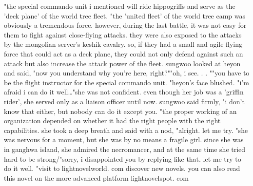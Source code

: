 "the special commando unit i mentioned will ride hippogriffs and serve as the 'deck plane' of the world tree fleet.
"the 'united fleet' of the world tree camp was obviously a tremendous force.
 however, during the last battle, it was not easy for them to fight against close-flying attacks.
 they were also exposed to the attacks by the mongolian server's keshik cavalry.
so, if they had a small and agile flying force that could act as a deck plane, they could not only defend against such an attack but also increase the attack power of the fleet.
sungwoo looked at heyon and said, "now you understand why you're here, right?""oh, i see.
.
.
""you have to be the flight instructor for the special commando unit.
"heyon's face blushed.
 "i'm afraid i can do it well…"she was not confident.
 even though her job was a 'griffin rider', she served only as a liaison officer until now.
 sungwoo said firmly, "i don't know that either, but nobody can do it except you.
"the proper working of an organization depended on whether it had the right people with the right capabilities.
 she took a deep breath and said with a nod, "alright.
 let me try.
"she was nervous for a moment, but she was by no means a fragile girl.
 since she was in ganghwa island, she admired the necromancer, and at the same time she tried hard to be strong/"sorry, i disappointed you by replying like that.
 let me try to do it well.
"visit to lightnovelworld.
com discover new novels.
 you can also read this novel on the more advanced platform lightnovelspot.
com

 